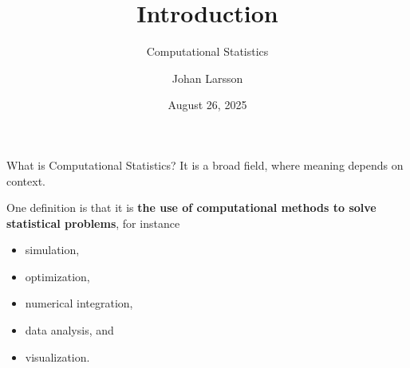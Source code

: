 \documentclass[
  ignorenonframetext,
  aspectratio=1610,
  onlytextwidth]{beamer}
\title{Introduction}
\subtitle{Computational Statistics}
\author{Johan Larsson}
\date{August 26, 2025}
\institute{Department of Mathematical Sciences, University of
Copenhagen}
\providecommand{\tightlist}{}
\begin{document}
\frame{\titlepage}


\begin{frame}{What is Computational Statistics?}
\label{what-is-computational-statistics}
It is a broad field, where meaning depends on context.

\pause

One definition is that it is \textbf{the use of computational methods to
solve statistical problems}, for instance

\pause

\begin{itemize}
\tightlist
\item
  simulation,
\item
  optimization,
\item
  numerical integration,
\item
  data analysis, and
\item
  visualization.
\end{itemize}
\end{frame}
\end{document}
